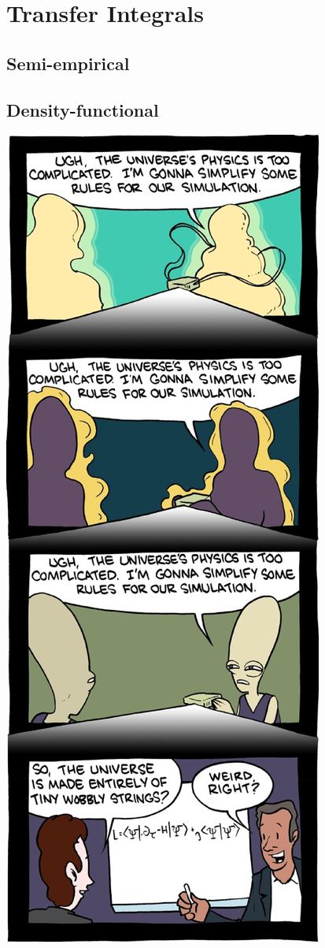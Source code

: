 \chapter{Transfer Integrals}

\section{Semi-empirical}

\section{Density-functional}
\includegraphics[width=0.4\linewidth]{fig/complicated}

